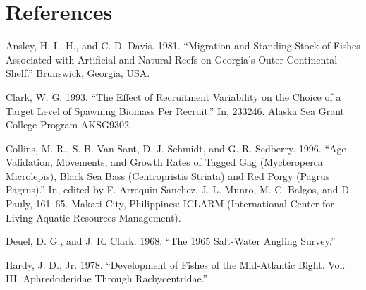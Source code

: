 \documentclass[
  letterpaper,
  oneside,
  open=any]{scrbook}
\newlength{\cslhangindent}
\newenvironment{CSLReferences}[2] %
 {\begin{list}{}{%
  \setlength{\itemindent}{0pt}
  \setlength{\leftmargin}{0pt}
  \setlength{\parsep}{0pt}
  \ifodd #1
   \setlength{\leftmargin}{\cslhangindent}
   \setlength{\itemindent}{-1\cslhangindent}
  \fi
  \setlength{\itemsep}{#2\baselineskip}}}
 {\end{list}}
\begin{document}

\chapter*{References}\label{references}


\label{refs}
\begin{CSLReferences}{1}{0}
Ansley, H. L. H., and C. D. Davis. 1981. {``Migration and Standing Stock
of Fishes Associated with Artificial and Natural Reefs on Georgia{'}s
Outer Continental Shelf.''} Brunswick, Georgia, USA.

Clark, W. G. 1993. {``The Effect of Recruitment Variability on the
Choice of a Target Level of Spawning Biomass Per Recruit.''} In, 233246.
Alaska Sea Grant College Program
AK{\textendash}SG{\textendash}93{\textendash}02.

Collins, M. R., S. B. Van Sant, D. J. Schmidt, and G. R. Sedberry. 1996.
{``Age Validation, Movements, and Growth Rates of Tagged Gag
(Mycteroperca Microlepis), Black Sea Bass (Centropristis Striata) and
Red Porgy (Pagrus Pagrus).''} In, edited by F. Arrequin-Sanchez, J. L.
Munro, M. C. Balgos, and D. Pauly, 161--65. Makati City, Philippines:
ICLARM (International Center for Living Aquatic Resources Management).

Deuel, D. G., and J. R. Clark. 1968. {``The 1965 Salt-Water Angling
Survey.''}

Hardy, J. D., Jr. 1978. {``Development of Fishes of the Mid-Atlantic
Bight. Vol. III. Aphredoderidae Through Rachycentridae.''}

\end{CSLReferences}


\backmatter
\end{document}

